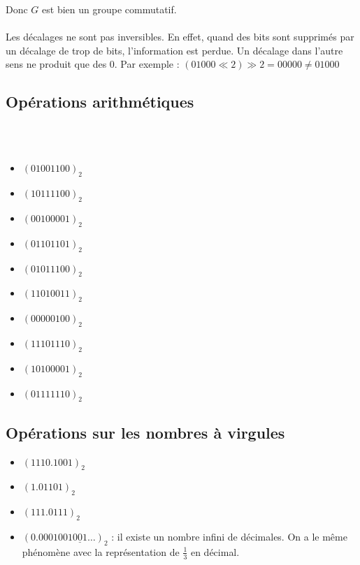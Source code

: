 \documentclass[../main.tex]{subfiles}
\begin{document}
Donc $G$ est bien un groupe commutatif.
\\ \\
 Les décalages ne sont pas inversibles. En effet, quand des bits sont supprimés par un décalage de trop de bits, l'information est perdue. Un décalage dans l'autre sens ne produit que des 0. Par exemple : $(01000 \ll 2) \gg 2 = 00000 \neq 01000$
\subsection{Opérations arithmétiques}
 \\ \\
\begin{minipage}{0.5\textwidth}
\begin{itemize}
	\item $(01001100)_{2}$
	\item $(10111100)_{2}$
	\item $(00100001)_{2}$
	\item $(01101101)_{2}$
	\item $(01011100)_{2}$
\end{itemize}
\end{minipage}
\begin{minipage}{0.5\textwidth}
\begin{itemize}
	\item $(11010011)_{2}$
	\item $(00000100)_{2}$
	\item $(11101110)_{2}$
	\item $(10100001)_{2}$
	\item $(01111110)_{2}$
\end{itemize}
\end{minipage}
\subsection{Opérations sur les nombres à virgules}
\begin{itemize}
	\item $(1110.1001)_2$
	\item $(1.01101)_2$
	\item $(111.0111)_2$
	\item $(0.0001001\underline{001}\dots)_2$ : il existe un nombre infini de décimales. On a le même phénomène avec la représentation de $\frac{1}{3}$ en décimal.
\end{itemize}
\end{document}
